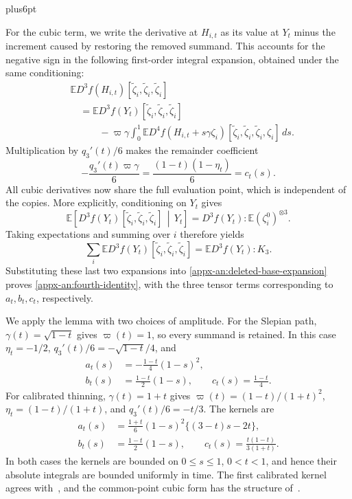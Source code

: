 \documentclass[11pt,letterpaper,twoside,leqno]{article}
\makeatletter
\theoremstyle{bookplain}
\theoremstyle{bookremark}
\renewenvironment{proof}[1][\proofname]{\par
  \pushQED{\qed}\normalfont\topsep6pt plus6pt\relax
  \trivlist\item[\hskip\labelsep\bfseries #1\@addpunct{.}]\ignorespaces
}{\popQED\endtrivlist\@endpefalse}
\newcommand{\E}{\mathbb E}
\newcommand{\dd}{\,d}
\makeatother
\begin{document}
\begin{proof}
For the cubic term, we write the derivative at $H_{i,t}$ as its
value at $Y_t$ minus the increment caused by restoring the removed
summand. This accounts for the negative sign in the following
first-order integral expansion, obtained under the same conditioning:
\[
 \begin{aligned}
 &\E D^3f(H_{i,t})
       [\widetilde\zeta_i,\widetilde\zeta_i,\widetilde\zeta_i]\\
 &\quad=\E D^3f(Y_t)
       [\widetilde\zeta_i,\widetilde\zeta_i,\widetilde\zeta_i]\\
 &\qquad\quad-\varpi\gamma\int_0^1
       \E D^4f(H_{i,t}+s\gamma\zeta_i)
       [\widetilde\zeta_i,\widetilde\zeta_i,
        \widetilde\zeta_i,\zeta_i]\dd s.
 \end{aligned}
\]
Multiplication by \(q_3'(t)/6\) makes the remainder coefficient
\[
 -\frac{q_3'(t)\varpi\gamma}{6}
 =\frac{(1-t)(1-\eta_t)}6=c_t(s).
\]
All cubic derivatives now share the full evaluation point, which
is independent of the copies. More explicitly, conditioning on
$Y_t$ gives
\[
 \E\!\left[
 D^3f(Y_t)[\widetilde\zeta_i,\widetilde\zeta_i,\widetilde\zeta_i]
 \,\middle|\,Y_t\right]
 =D^3f(Y_t):\E(\zeta_i^0)^{\otimes3}.
\]
Taking expectations and summing over $i$ therefore yields
\[
 \sum_i\E D^3f(Y_t)
       [\widetilde\zeta_i,\widetilde\zeta_i,\widetilde\zeta_i]
 =\E D^3f(Y_t):K_3.
\]
Substituting these last two expansions into
\eqref{appx-an:deleted-base-expansion} proves
\eqref{appx-an:fourth-identity}, with the three tensor terms
corresponding to \(a_t,b_t,c_t\), respectively.
\end{proof}

We apply the lemma with two choices of amplitude. For the Slepian
path, \(\gamma(t)=\sqrt{1-t}\) gives \(\varpi(t)=1\),
so every summand is retained. In this case
\(\eta_t=-1/2\), \(q_3'(t)/6=-\sqrt{1-t}/4\), and
\[
 \begin{aligned}
 a_t(s)&=-\frac{1-t}{4}(1-s)^2,\\
 b_t(s)&=\frac{1-t}{2}(1-s),\qquad
 c_t(s)=\frac{1-t}{4}.
 \end{aligned}
\]
For calibrated thinning, \(\gamma(t)=1+t\) gives
\(\varpi(t)=(1-t)/(1+t)^2\),
\(\eta_t=(1-t)/(1+t)\), and \(q_3'(t)/6=-t/3\). The kernels are
\[
 \begin{aligned}
 a_t(s)&=\frac{1+t}{6}(1-s)^2\{(3-t)s-2t\},\\
 b_t(s)&=\frac{1-t}{2}(1-s),\qquad
 c_t(s)=\frac{t(1-t)}{3(1+t)}.
 \end{aligned}
\]
In both cases the kernels are bounded on
\(0\le s\le1\), \(0<t<1\), and hence their absolute integrals
are bounded uniformly in time.
The first calibrated kernel agrees with~\cite[Lemma~4.1]{AL}, and
the common-point cubic form has the structure
of~\cite[Lemma~22]{GaoZhang}.
\end{document}
